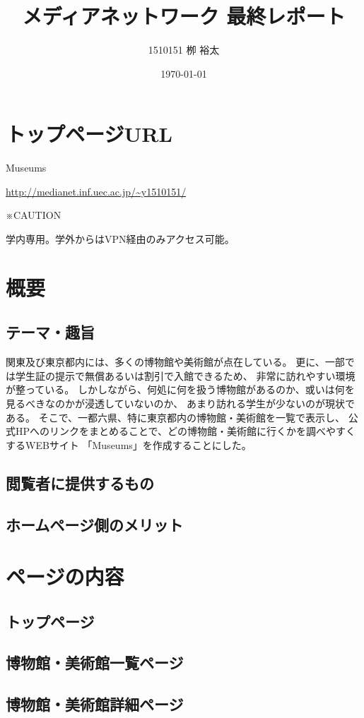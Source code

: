 \documentclass[11pt,a4paper, uplatex]{jsarticle}
\title{メディアネットワーク 最終レポート}
\author{1510151  栁 裕太}
\date{\today}
\begin{document}
\maketitle

\section{トップページURL}
Museums

 \url{http://medianet.inf.uec.ac.jp/~y1510151/}

※CAUTION

学内専用。学外からはVPN経由のみアクセス可能。

\section{概要}
\subsection{テーマ・趣旨}
関東及び東京都内には、多くの博物館や美術館が点在している。
更に、一部では学生証の提示で無償あるいは割引で入館できるため、
非常に訪れやすい環境が整っている。
しかしながら、何処に何を扱う博物館があるのか、或いは何を見るべきなのかが浸透していないのか、
あまり訪れる学生が少ないのが現状である。
そこで、一都六県、特に東京都内の博物館・美術館を一覧で表示し、
公式HPへのリンクをまとめることで、どの博物館・美術館に行くかを調べやすくするWEBサイト
「Museums」を作成することにした。

\subsection{閲覧者に提供するもの}
\subsection{ホームページ側のメリット}

\section{ページの内容}
\subsection{トップページ}
\subsection{博物館・美術館一覧ページ}
\subsection{博物館・美術館詳細ページ}
\end{document}
